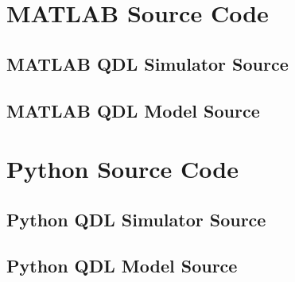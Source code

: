 
\begin{landscape}
    
\chapter{MATLAB Source Code}\label{chap:matlab_source}

\section{MATLAB QDL Simulator Source}


\section{MATLAB QDL Model Source}

    
\chapter{Python Source Code}\label{chap:python_source}

\section{Python QDL Simulator Source}

    
\section{Python QDL Model Source}


\end{landscape}
